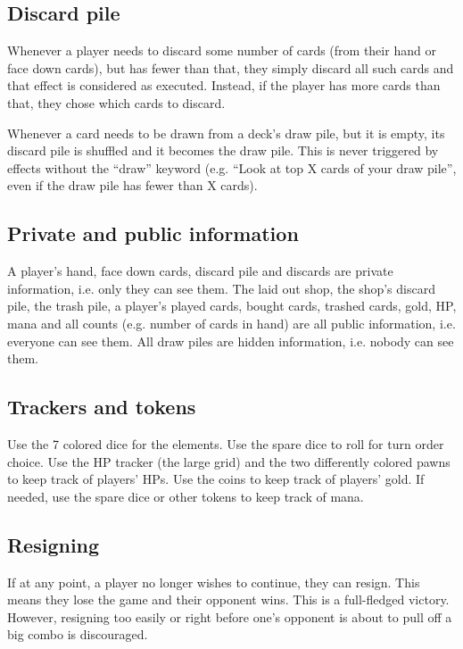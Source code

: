 \documentclass[dvipsnames,parskip,a4paper]{scrartcl}
\begin{document}
\subsection*{Discard pile}

Whenever a player needs to discard some number of cards (from their hand or face down cards), but has fewer than that, they simply discard all such cards and that effect is considered as executed. Instead, if the player has more cards than that, they chose which cards to discard.

\vspace*{4pt}

Whenever a card needs to be drawn from a deck's draw pile, but it is empty, its discard pile is shuffled and it becomes the draw pile. This is never triggered by effects without the ``draw'' keyword (e.g. ``Look at top X cards of your draw pile'', even if the draw pile has fewer than X cards).

\subsection*{Private and public information}

A player's hand, face down cards, discard pile and discards are private information, i.e. only they can see them. The laid out shop, the shop's discard pile, the trash pile, a player's played cards, bought cards, trashed cards, gold, HP, mana and all counts (e.g. number of cards in hand) are all public information, i.e. everyone can see them. All draw piles are hidden information, i.e. nobody can see them.

\subsection*{Trackers and tokens}

Use the 7 colored dice for the elements. Use the spare dice to roll for turn order choice. Use the HP tracker (the large grid) and the two differently colored pawns to keep track of players' HPs. Use the coins to keep track of players' gold. If needed, use the spare dice or other tokens to keep track of mana.

\subsection*{Resigning}

If at any point, a player no longer wishes to continue, they can resign. This means they lose the game and their opponent wins. This is a full-fledged victory. However, resigning too easily or right before one's opponent is about to pull off a big combo is discouraged.
\end{document}
